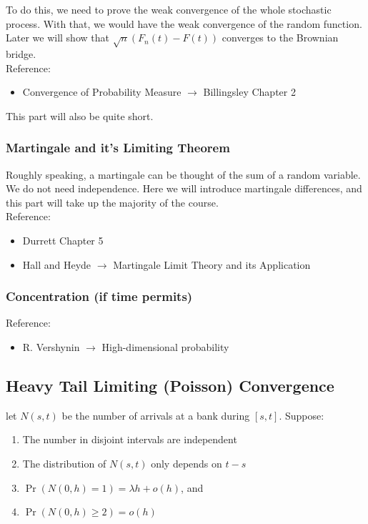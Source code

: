 \documentclass[../main/main.tex]{subfiles}
\begin{document}
To do this, we need to prove the weak convergence of the whole stochastic process. With that, we would have the weak convergence of the random function. Later we will show that \(\sqrt{n}(F_n(t)-F(t))\) converges to the Brownian bridge.\\

Reference:
\begin{itemize}
	\item Convergence of Probability Measure \(\to\) Billingsley Chapter 2
\end{itemize}

This part will also be quite short.


\subsubsection{Martingale and it's Limiting Theorem}

Roughly speaking, a martingale can be thought of the sum of a random variable. We do not need independence. Here we will introduce martingale differences, and this part will take up the majority of the course.\\

Reference:
\begin{itemize}
	\item Durrett Chapter 5 \cite{Durrett19}
	\item Hall and Heyde \(\to\) Martingale Limit Theory and its Application \cite{hall1980martingale}
\end{itemize}

\subsubsection{Concentration (if time permits)}


Reference:
\begin{itemize}
	\item R. Vershynin \(\to\) High-dimensional probability
\end{itemize}


\subsection{Heavy Tail Limiting (Poisson) Convergence}

let $N(s,t)$ be the number of arrivals at a bank during $[s,t]$. Suppose:

\begin{enumerate}[label=(\roman*)]
	\item  The number in disjoint intervals are independent
	\item The distribution of $N(s,t)$ only depends on $t-s$
	\item $\Pr(N(0,h)=1) = \lambda h + o(h)$, and
	\item $\Pr(N(0,h)\geq 2) = o(h)$
\end{enumerate}
\end{document}
